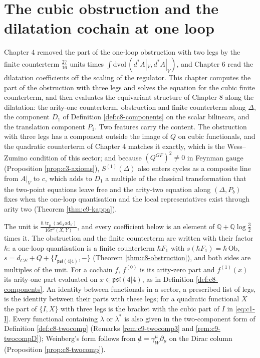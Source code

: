 \chapter{The cubic obstruction and the dilatation cochain at one loop}

Chapter 4 removed the part of the one-loop obstruction with two legs by the finite counterterm $\tfrac{27}{16}$ units times $\int\mathrm{dvol}\,(d^*A|_V,d^*A|_V)$, and Chapter 6 read the dilatation coefficients off the scaling of the regulator. This chapter computes the part of the obstruction with three legs and solves the equation for the cubic finite counterterm, and then evaluates the equivariant structure of Chapter 8 along the dilatation: the arity-one counterterm, obstruction and finite counterterm along $\Delta$, the component $D_1$ of Definition \ref{def:c8-components} on the scalar bilinears, and the translation component $P_1$. Two features carry the content. The obstruction with three legs has a component outside the image of $Q$ on cubic functionals, and the quadratic counterterm of Chapter 4 matches it exactly, which is the Wess--Zumino condition of this sector; and because $(Q^{GF})^2\neq0$ in Feynman gauge (Proposition \ref{prop:c3-axioms}), $S^{(1)}(\Delta)$ also enters cycles as a composite line from $A|_V$ to $c$, which adds to $D_1$ a multiple of the classical transformation that the two-point equations leave free and the arity-two equation along $(\Delta,P_b)$ fixes when the one-loop quantisation and the local representatives exist through arity two (Theorem \ref{thm:c9-kappa}).

The unit is $\frac{\hbar\operatorname{tr}_{\mathfrak g}(\mathrm{ad}_X\mathrm{ad}_Y)}{16\pi^2(X,Y)}$, and every coefficient below is an element of $\mathbb Q+\mathbb Q\log\tfrac32$ times it. The obstruction and the finite counterterm are written with their factor $\hbar$: a one-loop quantisation is a finite counterterm $\hbar F_1$ with $s(\hbar F_1)=\hbar\,\mathrm{Ob}$, $s=d_{CE}+Q+\{I_{\mathfrak{psl}(4|4)},-\}$ (Theorem \ref{thm:c8-obstruction}), and both sides are multiples of the unit. For a cochain $f$, $f^{(0)}$ is its arity-zero part and $f^{(1)}(x)$ its arity-one part evaluated on $x\in\mathfrak{psl}(4|4)$, as in Definition \ref{def:c8-components}. An identity between functionals in a sector, a prescribed list of legs, is the identity between their parts with these legs; for a quadratic functional $X$ the part of $\{I,X\}$ with three legs is the bracket with the cubic part of $I$ in \eqref{eq:c1-I}. Every functional containing $\lambda$ or $\lambda^*$ is also given in the two-component form of Definition \ref{def:c8-twocomp} (Remarks \ref{rem:c9-twocomp3} and \ref{rem:c9-twocompD}); Weinberg's form follows from ${\not d}=\gamma_W^\mu\partial_\mu$ on the Dirac column (Proposition \ref{prop:c8-twocomp}).

